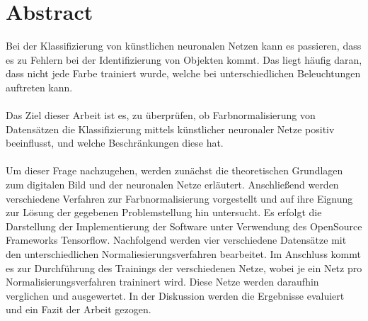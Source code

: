 \chapter*{Abstract}
Bei der Klassifizierung von künstlichen neuronalen Netzen kann es passieren, dass es zu Fehlern bei der Identifizierung von Objekten kommt. Das liegt häufig daran, dass nicht jede Farbe trainiert wurde, welche bei unterschiedlichen Beleuchtungen auftreten kann.\\\\
Das Ziel dieser Arbeit ist es, zu überprüfen, ob Farbnormalisierung von Datensätzen die Klassifizierung mittels künstlicher neuronaler Netze positiv beeinflusst, und welche Beschränkungen diese hat.\\\\
Um dieser Frage nachzugehen, werden zunächst die theoretischen Grundlagen zum digitalen Bild und der neuronalen Netze erläutert. Anschließend  werden  verschiedene Verfahren zur Farbnormalisierung vorgestellt und auf ihre Eignung zur Lösung der gegebenen Problemstellung hin untersucht. Es erfolgt die Darstellung der Implementierung der Software unter Verwendung des OpenSource Frameworks Tensorflow. Nachfolgend werden vier verschiedene Datensätze mit den unterschiedlichen Normaliesierungsverfahren bearbeitet. Im Anschluss kommt es zur Durchführung des Trainings der verschiedenen Netze, wobei je ein Netz pro Normalisierungsverfahren traininert wird. Diese Netze werden daraufhin verglichen und ausgewertet. In der Diskussion werden die Ergebnisse evaluiert und ein Fazit der Arbeit gezogen.
